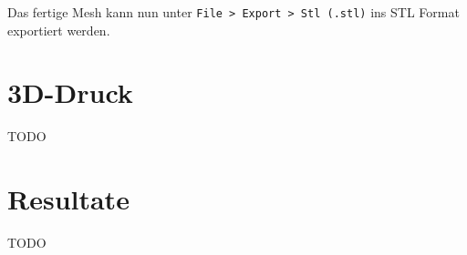 Das fertige Mesh kann nun unter \texttt{File > Export > Stl (.stl)} ins STL
Format exportiert werden.


\section{3D-Druck}

TODO


\section{Resultate}

TODO
